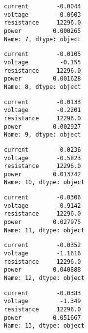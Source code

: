 \documentclass[11pt]{article}
\begin{document}
    
    
    \begin{Verbatim}[commandchars=\\\{\}]
current        -0.0044
voltage        -0.0603
resistance     12296.0
power         0.000265
Name: 7, dtype: object
    \end{Verbatim}

    
    
    \begin{Verbatim}[commandchars=\\\{\}]
current        -0.0105
voltage         -0.155
resistance     12296.0
power         0.001628
Name: 8, dtype: object
    \end{Verbatim}

    
    
    \begin{Verbatim}[commandchars=\\\{\}]
current        -0.0133
voltage        -0.2201
resistance     12296.0
power         0.002927
Name: 9, dtype: object
    \end{Verbatim}

    
    
    \begin{Verbatim}[commandchars=\\\{\}]
current        -0.0236
voltage        -0.5823
resistance     12296.0
power         0.013742
Name: 10, dtype: object
    \end{Verbatim}

    
    
    \begin{Verbatim}[commandchars=\\\{\}]
current        -0.0306
voltage        -0.9142
resistance     12296.0
power         0.027975
Name: 11, dtype: object
    \end{Verbatim}

    
    
    \begin{Verbatim}[commandchars=\\\{\}]
current        -0.0352
voltage        -1.1616
resistance     12296.0
power         0.040888
Name: 12, dtype: object
    \end{Verbatim}

    
    
    \begin{Verbatim}[commandchars=\\\{\}]
current        -0.0383
voltage         -1.349
resistance     12296.0
power         0.051667
Name: 13, dtype: object
    \end{Verbatim}
\end{document}
